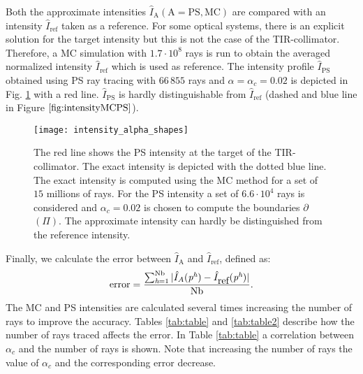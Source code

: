 Both the approximate intensities $\hat{I}_{\textrm{A}} (\textrm{A} = \textrm{PS}, \textrm{MC})$ are compared with an intensity $\hat{I}_{\textrm{ref}}$ taken as a reference. For some optical systems, there is an explicit solution for the target intensity but this is not the case of the TIR-collimator.
Therefore, a MC simulation with $1.7 \cdot 10^8$ rays is run to obtain the averaged normalized intensity $\hat{I}_{\mbox{ref}}$ which is used as reference.
The intensity profile $\hat{I}_{\textrm{PS}}
$ obtained using PS ray tracing with $66\,855$ rays and $\alpha= \alpha_c = 0.02$ is depicted in Fig. \ref{fig:intensityMCPS} with a red line.
$\hat{I}_{\textrm{PS}}$ is hardly distinguishable from $\hat{I}_{\mbox{ref}}$ (dashed and blue line in Figure $\ref{fig:intensityMCPS}$).\\ \indent
  \begin{figure}[h]
    \centering
    \texttt{[image: intensity\_alpha\_shapes]}
\caption{The red line shows the PS intensity at the target of the TIR-collimator. The exact intensity is depicted with the dotted blue line.
The exact intensity is computed using the MC method for a set of $15$ millions of rays. For the PS intensity a set of $6.6\cdot 10^4$
rays is considered and $\alpha_c = 0.02$ is chosen to compute the boundaries $\partial$$(\Pi)$. The approximate intensity can hardly be distinguished from the reference intensity.}
  \label{fig:intensityMCPS}
\end{figure}
Finally, we calculate the error between $\hat{I}_{\textrm{A}}$ and $\hat{I}_{\textrm{ref}}$, defined as:
\begin{equation}\label{eq:error}
\mbox{error} = \frac{\sum_{\textit{h}= 1}^{\textrm{Nb}}| \hat{I}_{A}(\textit{p}^{\textit{h}}) - \hat{I}_{\mbox{ref}}(\textit{p}^{\textit{h}})|}{\textrm{Nb}}.
\end{equation}
The MC and PS intensities are calculated several times increasing the number of rays to improve the accuracy.
Tables \ref{tab:table} and \ref{tab:table2} describe how the number of rays traced affects the error. 
In Table \ref{tab:table} a correlation between $\alpha_c$ and the number of rays is shown.
Note that increasing the number of rays the value of $\alpha_c$ and the corresponding error decrease. 
